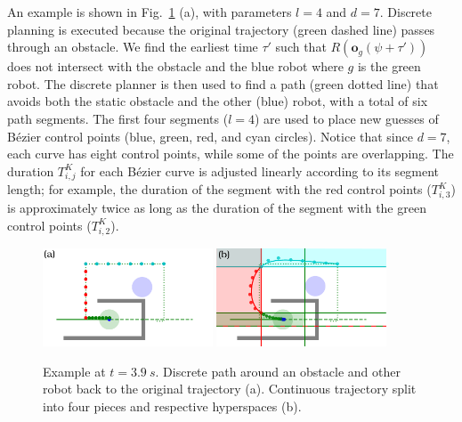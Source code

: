 \documentclass{svproc}
\newcommand{\vo}{\mathbf{o}}
\begin{document}
An example is shown in Fig.~\ref{fig:swap2_2} (a), with parameters $l=4$ and $d=7$.
Discrete planning is executed because the original trajectory (green dashed line) passes through an obstacle.
We find the earliest time $\tau'$ such that $R(\vo_g(\psi+\tau'))$ does not intersect with the obstacle and the blue robot where $g$ is the green robot. %
The discrete planner is then used to find a path  (green dotted line) that avoids both the static obstacle and the other (blue) robot, with a total of six path segments.
The first four segments ($l=4$) are used to place new guesses of B\'ezier control points (blue, green, red, and cyan circles).
Notice that since $d=7$, each curve has eight control points, while some of the points are overlapping.
The duration $T^{K}_{i,j}$ for each B\'ezier curve is adjusted linearly according to its segment length; for example, the duration of the segment with the red control points ($T_{i,3}^K$) is approximately twice as long as the duration of the segment with the green control points ($T_{i,2}^K$).

\begin{figure}
\centering
\includegraphics[width=0.45\textwidth]{images/swap2_discrete.pdf}
\hfill
\includegraphics[width=0.45\textwidth]{images/swap2_cont_red.pdf}
\caption{
Example at $t=\SI{3.9}{s}$.
Discrete path around an obstacle and other robot back to the original trajectory (a).
Continuous trajectory split into four pieces and respective hyperspaces (b).
}
\label{fig:swap2_2}
\end{figure}
\end{document}
